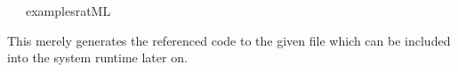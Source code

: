 \begin{isabellebody}
\ \ \ {}examples{}rat{}ML{}%
\endisatagquote
{\isafoldquote}%
%
\isadelimquote
%
\endisadelimquote
%
\begin{isamarkuptext}%
\noindent This merely generates the referenced code to the given
  file which can be included into the system runtime later on.%
\end{isamarkuptext}%
\isamarkuptrue%
%
\isadelimtheory
%
\endisadelimtheory
%
\isatagtheory
{}\isamarkupfalse%
%
\endisatagtheory
{\isafoldtheory}%
%
\isadelimtheory
%
\endisadelimtheory
\isanewline
\isanewline
\end{isabellebody}%
